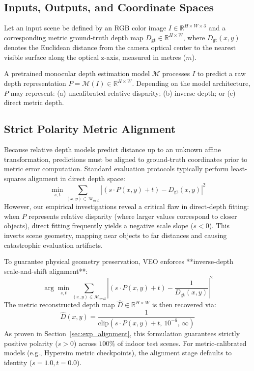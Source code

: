 \documentclass[11pt,a4paper]{article}
\begin{document}
\subsection{Inputs, Outputs, and Coordinate Spaces}
Let an input scene be defined by an RGB color image $I \in \mathbb{R}^{H \times W \times 3}$ and a corresponding metric ground-truth depth map $D_{\mathrm{gt}} \in \mathbb{R}^{H \times W}$, where $D_{\mathrm{gt}}(x,y)$ denotes the Euclidean distance from the camera optical center to the nearest visible surface along the optical z-axis, measured in metres ($m$).

A pretrained monocular depth estimation model $\mathcal{M}$ processes $I$ to predict a raw depth representation $P = \mathcal{M}(I) \in \mathbb{R}^{H \times W}$. Depending on the model architecture, $P$ may represent: (a) uncalibrated relative disparity; (b) inverse depth; or (c) direct metric depth.

\subsection{Strict Polarity Metric Alignment}
\label{sec:alignment}
Because relative depth models predict distance up to an unknown affine transformation, predictions must be aligned to ground-truth coordinates prior to metric error computation. Standard evaluation protocols typically perform least-squares alignment in direct depth space:
\begin{equation}
\label{eq:direct_alignment}
\min_{s, t} \sum_{(x,y) \in \mathcal{M}_{\mathrm{eval}}} \left| \left( s \cdot P(x,y) + t \right) - D_{\mathrm{gt}}(x,y) \right|^2
\end{equation}
However, our empirical investigations reveal a critical flaw in direct-depth fitting: when $P$ represents relative disparity (where larger values correspond to closer objects), direct fitting frequently yields a negative scale slope ($s < 0$). This inverts scene geometry, mapping near objects to far distances and causing catastrophic evaluation artifacts.

To guarantee physical geometry preservation, VEO enforces **inverse-depth scale-and-shift alignment**:
\begin{equation}
\label{eq:inverse_alignment}
\arg\min_{s, t} \sum_{(x,y) \in \mathcal{M}_{\mathrm{eval}}} \left| \left( s \cdot P(x,y) + t \right) - \frac{1}{D_{\mathrm{gt}}(x,y)} \right|^2
\end{equation}
The metric reconstructed depth map $\hat{D} \in \mathbb{R}^{H \times W}$ is then recovered via:
\begin{equation}
\label{eq:metric_recovery}
\hat{D}(x,y) = \frac{1}{\text{clip}\left( s \cdot P(x,y) + t, \, 10^{-6}, \, \infty \right)}
\end{equation}
As proven in Section~\ref{sec:exp_alignment}, this formulation guarantees strictly positive polarity ($s > 0$) across $100\%$ of indoor test scenes. For metric-calibrated models (e.g., Hypersim metric checkpoints), the alignment stage defaults to identity ($s = 1.0, t = 0.0$).
\end{document}
